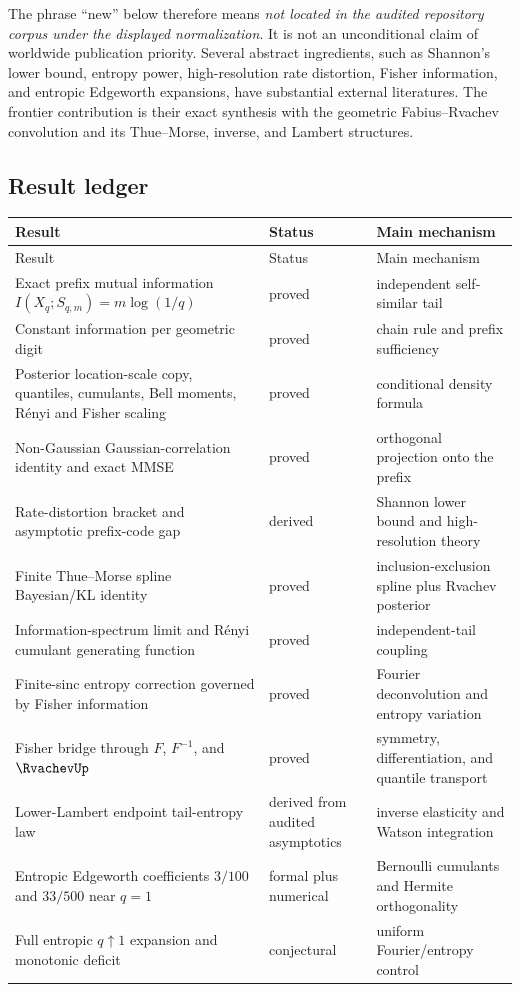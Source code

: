\documentclass[11pt,oneside]{article}
\theoremstyle{definition}
\theoremstyle{remark}
\begin{document}
The phrase ``new'' below therefore means \emph{not located in the audited repository
corpus under the displayed normalization}.  It is not an unconditional claim of
worldwide publication priority.  Several abstract ingredients, such as Shannon's
lower bound, entropy power, high-resolution rate distortion, Fisher information,
and entropic Edgeworth expansions, have substantial external literatures.  The
frontier contribution is their exact synthesis with the geometric Fabius--Rvachev
convolution and its Thue--Morse, inverse, and Lambert structures.

\subsection{Result ledger}

\begin{longtable}{@{}p{}p{}p{}@{}}
\toprule
Result & Status & Main mechanism \\
\midrule
\endfirsthead
\toprule
Result & Status & Main mechanism \\
\midrule
\endhead
Exact prefix mutual information $I(X_q;S_{q,m})=m\log(1/q)$ & proved & independent self-similar tail \\
Constant information per geometric digit & proved & chain rule and prefix sufficiency \\
Posterior location-scale copy, quantiles, cumulants, Bell moments, R\'enyi and Fisher scaling & proved & conditional density formula \\
Non-Gaussian Gaussian-correlation identity and exact MMSE & proved & orthogonal projection onto the prefix \\
Rate-distortion bracket and asymptotic prefix-code gap & derived & Shannon lower bound and high-resolution theory \\
Finite Thue--Morse spline Bayesian/KL identity & proved & inclusion-exclusion spline plus Rvachev posterior \\
Information-spectrum limit and R\'enyi cumulant generating function & proved & independent-tail coupling \\
Finite-sinc entropy correction governed by Fisher information & proved & Fourier deconvolution and entropy variation \\
Fisher bridge through $F$, $F^{-1}$, and $\RvachevUp$ & proved & symmetry, differentiation, and quantile transport \\
Lower-Lambert endpoint tail-entropy law & derived from audited asymptotics & inverse elasticity and Watson integration \\
Entropic Edgeworth coefficients $3/100$ and $33/500$ near $q=1$ & formal plus numerical & Bernoulli cumulants and Hermite orthogonality \\
Full entropic $q\uparrow1$ expansion and monotonic deficit & conjectural & uniform Fourier/entropy control \\
\bottomrule
\end{longtable}
\end{document}
